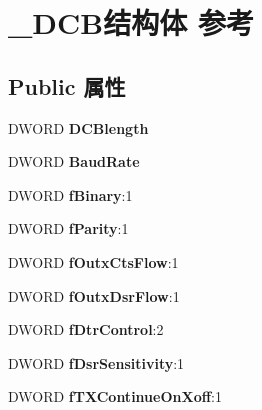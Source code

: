 \hypertarget{struct___d_c_b}{}\section{\+\_\+\+D\+C\+B结构体 参考}
\label{struct___d_c_b}
\subsection*{Public 属性}
\begin{DoxyCompactItemize}
\item 
\mbox{\label{struct___d_c_b_ac32a70e0a37002d318ca1ab1a57a0fe7}} 
D\+W\+O\+RD {\bfseries D\+C\+Blength}
\item 
\mbox{\label{struct___d_c_b_a30cf5635b26fc62c821fb9b33848820b}} 
D\+W\+O\+RD {\bfseries Baud\+Rate}
\item 
\mbox{\label{struct___d_c_b_a3e64f209f916f73b63a9ee0e98967dae}} 
D\+W\+O\+RD {\bfseries f\+Binary}\+:1
\item 
\mbox{\label{struct___d_c_b_ab5b4d8f90d3d33573738fd9bc5747dc0}} 
D\+W\+O\+RD {\bfseries f\+Parity}\+:1
\item 
\mbox{\label{struct___d_c_b_a086776d85574b3f8c01e322d47ba0f07}} 
D\+W\+O\+RD {\bfseries f\+Outx\+Cts\+Flow}\+:1
\item 
\mbox{\label{struct___d_c_b_a2a8fe741a5fd8865cce99c3820800698}} 
D\+W\+O\+RD {\bfseries f\+Outx\+Dsr\+Flow}\+:1
\item 
\mbox{\label{struct___d_c_b_a729aee7bece7644ec582c8dc7d1b5278}} 
D\+W\+O\+RD {\bfseries f\+Dtr\+Control}\+:2
\item 
\mbox{\label{struct___d_c_b_a3e89f843418ff25254388adf2aa67835}} 
D\+W\+O\+RD {\bfseries f\+Dsr\+Sensitivity}\+:1
\item 
\mbox{\label{struct___d_c_b_ac4e10981a79858b1e09e7c056d573b97}} 
D\+W\+O\+RD {\bfseries f\+T\+X\+Continue\+On\+Xoff}\+:1
\item 
\mbox{\label{struct___d_c_b_ae20e9c0ea8603daac06825e42bf5d073}} 

\end{DoxyCompactItemize}
